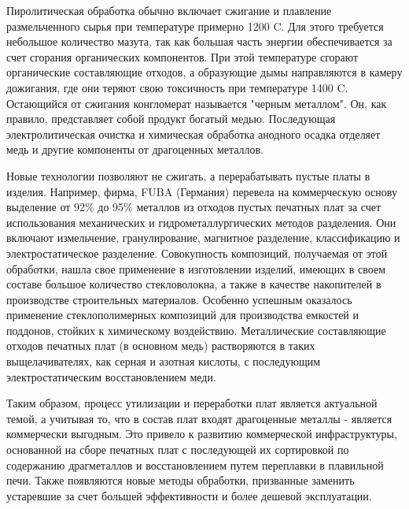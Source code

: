 Пиролитическая обработка обычно включает сжигание и плавление размельченного сырья при температуре примерно 1200 \textdegree C. Для этого требуется небольшое количество мазута, так как большая часть энергии обеспечивается за счет сгорания органических компонентов. При этой температуре сгорают органические составляющие отходов, а образующие дымы направляются в камеру дожигания, где они теряют свою токсичность при температуре 1400 \textdegree C. Остающийся от сжигания конгломерат называется "черным металлом". Он, как правило, представляет собой продукт богатый медью. Последующая электролитическая очистка и химическая обработка анодного осадка отделяет медь и другие компоненты от драгоценных металлов.

Новые технологии позволяют не сжигать, а перерабатывать пустые платы в изделия. Например, фирма, FUBA (Германия) перевела на коммерческую основу выделение от 92\% до 95\% металлов из отходов пустых печатных плат за счет использования механических и гидрометаллургических методов разделения. Они включают измельчение, гранулирование, магнитное разделение, классификацию и электростатическое разделение. Совокупность композиций, получаемая от этой обработки, нашла свое применение в изготовлении изделий, имеющих в своем составе большое количество стекловолокна, а также в качестве накопителей в производстве строительных материалов. Особенно успешным оказалось применение стеклополимерных композиций для производства емкостей и поддонов, стойких к химическому воздействию. Металлические составляющие отходов печатных плат (в основном медь) растворяются в таких выщелачивателях, как серная и азотная кислоты, с последующим электростатическим восстановлением меди.

Таким образом, процесс утилизации и переработки плат является актуальной темой, а учитывая то, что в состав плат входят драгоценные металлы - является коммерчески выгодным. Это привело к развитию коммерческой инфраструктуры, основанной на сборе печатных плат с последующей их сортировкой по содержанию драгметаллов и восстановлением путем переплавки в плавильной печи. Также появляются новые методы обработки, призванные заменить устаревшие за счет большей эффективности и более дешевой эксплуатации.
